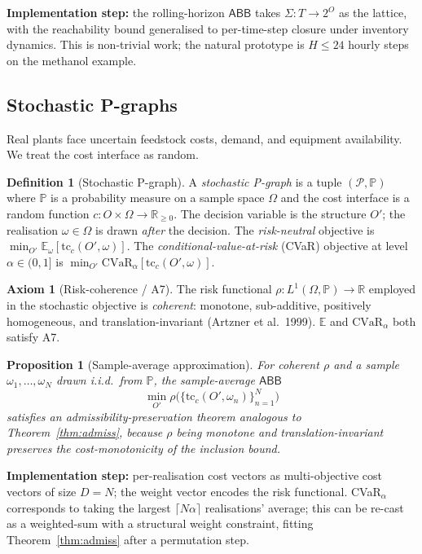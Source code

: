 \documentclass[11pt,a4paper]{article}
\theoremstyle{plain}
\newtheorem{proposition}[theorem]{Proposition}
\theoremstyle{definition}
\newtheorem{definition}[theorem]{Definition}
\newtheorem{axiom}{Axiom}[section]
\newcommand{\abb}{\textsf{ABB}}
\newcommand{\Real}{\mathbb{R}}
\newcommand{\Realp}{\Real_{\geq 0}}
\begin{document}
\textbf{Implementation step:} the rolling-horizon $\abb$ takes
$\Sigma : T \to 2^O$ as the lattice, with the reachability bound
generalised to per-time-step closure under inventory dynamics.
This is non-trivial work; the natural prototype is $H \leq 24$
hourly steps on the methanol example.

\subsection{Stochastic P-graphs}

Real plants face uncertain feedstock costs, demand, and
equipment availability. We treat the cost interface as random.

\begin{definition}[Stochastic P-graph]
\label{def:stoch}
A \emph{stochastic P-graph} is a tuple
$(\mathcal{P}, \mathbb{P})$ where $\mathbb{P}$ is a probability
measure on a sample space $\Omega$ and the cost interface is a
random function
$c : O \times \Omega \to \Realp$. The decision variable is the
structure $O'$; the realisation $\omega \in \Omega$ is drawn
\emph{after} the decision. The \emph{risk-neutral} objective is
$
\min_{O'} \mathbb{E}_\omega[\mathrm{tc}_c(O', \omega)].
$
The \emph{conditional-value-at-risk} (CVaR) objective at level
$\alpha \in (0, 1]$ is
$
\min_{O'} \mathrm{CVaR}_\alpha[\mathrm{tc}_c(O', \omega)].
$
\end{definition}

\begin{axiom}[Risk-coherence / A7]
\label{ax:risk}
The risk functional $\rho : L^1(\Omega, \mathbb{P}) \to \Real$
employed in the stochastic objective is \emph{coherent}: monotone,
sub-additive, positively homogeneous, and translation-invariant
(Artzner et al.\ 1999). $\mathbb{E}$ and $\mathrm{CVaR}_\alpha$ both
satisfy A7.
\end{axiom}

\begin{proposition}[Sample-average approximation]
\label{prop:saa}
For coherent $\rho$ and a sample $\omega_1, \ldots, \omega_N$ drawn
i.i.d.\ from $\mathbb{P}$, the sample-average $\abb$
\[
\min_{O'} \rho\bigl(\{\mathrm{tc}_c(O', \omega_n)\}_{n=1}^N\bigr)
\]
satisfies an admissibility-preservation theorem analogous to
Theorem~\ref{thm:admiss}, because $\rho$ being monotone and
translation-invariant preserves the cost-monotonicity of the
inclusion bound.
\end{proposition}

\textbf{Implementation step:} per-realisation cost vectors as
multi-objective cost vectors of size $D = N$; the weight vector
encodes the risk functional. CVaR$_\alpha$ corresponds to taking
the largest $\lceil N \alpha\rceil$ realisations' average; this can
be re-cast as a weighted-sum with a structural weight constraint,
fitting Theorem~\ref{thm:admiss} after a permutation step.
\end{document}
